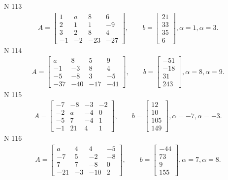 \documentclass[11pt]{report}
\begin{document}
N 113
\begin{align*}
 A = \left[\begin{matrix}1 & a & 8 & 6\\2 & 1 & 1 & -9\\3 & 2 & 8 & 4\\-1 & -2 & -23 & -27\end{matrix}\right],
    \qquad b = \left[\begin{matrix}21\\33\\35\\6\end{matrix}\right], \alpha = 1, \alpha = 3. 
 \end{align*}
N 114
\begin{align*}
 A = \left[\begin{matrix}a & 8 & 5 & 9\\-1 & -3 & 8 & 4\\-5 & -8 & 3 & -5\\-37 & -40 & -17 & -41\end{matrix}\right],
    \qquad b = \left[\begin{matrix}-51\\-18\\31\\243\end{matrix}\right], \alpha = 8, \alpha = 9. 
 \end{align*}
N 115
\begin{align*}
 A = \left[\begin{matrix}-7 & -8 & -3 & -2\\-2 & a & -4 & 0\\-5 & 7 & -4 & 1\\-1 & 21 & 4 & 1\end{matrix}\right],
    \qquad b = \left[\begin{matrix}12\\10\\105\\149\end{matrix}\right], \alpha = -7, \alpha = -3. 
 \end{align*}
N 116
\begin{align*}
 A = \left[\begin{matrix}a & 4 & 4 & -5\\-7 & 5 & -2 & -8\\7 & 7 & -8 & 0\\-21 & -3 & -10 & 2\end{matrix}\right],
    \qquad b = \left[\begin{matrix}-44\\73\\9\\155\end{matrix}\right], \alpha = 7, \alpha = 8. 
 \end{align*}
\end{document}

